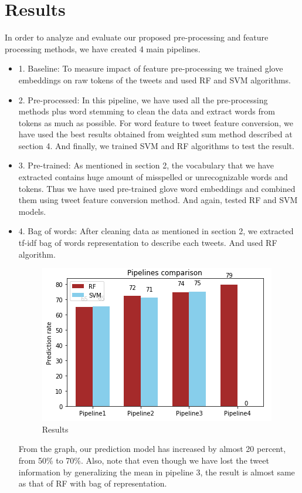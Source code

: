 \documentclass[10pt,conference,compsocconf]{IEEEtran}
\begin{document}
\section{Results}\label{S6}
\label{S4}
In order to analyze and evaluate our proposed pre-processing and feature processing methods, we have created 4 main pipelines.
\begin{itemize}
	\item 1. Baseline: 
	To measure impact of feature pre-processing we trained glove embeddings on raw tokens of the tweets and used RF and SVM algorithms.
	\item 2. Pre-processed:
	In this pipeline, we have used all the pre-processing methods plus word stemming to clean the data and extract words from tokens as much as possible. For word feature to tweet feature conversion, we have used the best results obtained from weighted sum method described at section 4. And finally, we trained SVM and RF algorithms to test the result.
	\item 3. Pre-trained:
	As mentioned in section 2, the vocabulary that we have extracted contains huge amount of misspelled or unrecognizable words and tokens. Thus we have used pre-trained glove word embeddings and combined them using tweet feature conversion method. And again, tested RF and SVM models.
	\item 4. Bag of words:
	After cleaning data as mentioned in section 2, we extracted tf-idf bag of words representation to describe each tweets. And used RF algorithm.
	
\begin{tiny}
	\begin{figure}[b] \label{fig5}
		\includegraphics[scale=0.8]{results.png}   
		\caption{Results }
		\label{fig5}    
	\end{figure}
\end{tiny}

From the graph, our prediction model has increased by almost 20 percent, from 50\% to 70\%.  Also, note that even though we have lost the tweet information by generalizing the mean in pipeline 3, the result is almost same as that of RF with bag of representation. 
\end{itemize}
\end{document}
